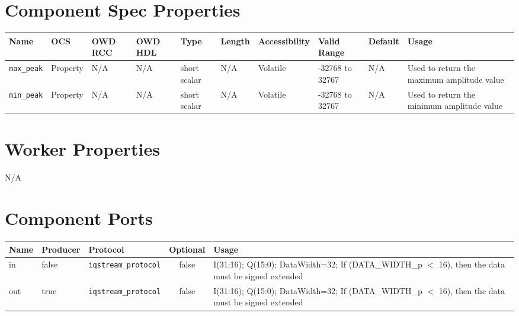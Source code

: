 \documentclass{article}
\begin{document}
\begin{landscape}
\section*{Component Spec Properties}

\begin{flushleft}

	\begin{scriptsize}
	\begin{tabular}{|p{1.5cm}|p{1.5cm}|p{1.5cm}|p{1.5cm}|p{2cm}|p{1cm}|p{1.5cm}|p{2cm}|p{1.5cm}|p{5cm}|}
		\hline
		\rowcolor{blue}
		Name & OCS & OWD RCC & OWD HDL & Type & Length  & Accessibility & Valid Range & Default & Usage \\
		\hline
		\verb+max_peak+ & Property & N/A & N/A & short scalar & N/A & Volatile & -32768 to 32767 & N/A & Used to return the maximum amplitude value\\
		\hline
		\verb+min_peak+ & Property & N/A & N/A & short scalar & N/A & Volatile & -32768 to 32767 & N/A & Used to return the minimum amplitude value\\
		\hline
	\end{tabular}
	\end{scriptsize}


\end{flushleft}

\section*{Worker Properties}
		N/A

\section*{Component Ports}

		\scriptsize
		\begin{tabular}{|M{2cm}|M{1cm}|M{4cm}|c|M{13.5cm}|}
			\hline
			Name & Producer & Protocol & Optional & Usage\\
			\hline
			in
			& false
			& \verb+iqstream_protocol+
			& false
			& I(31:16); Q(15:0); DataWidth=32; If (DATA\_WIDTH\_p $<$ 16), then the data must be signed extended \\
			\hline
			out
			& true
			& \verb+iqstream_protocol+
			& false
			& I(31:16); Q(15:0); DataWidth=32; If (DATA\_WIDTH\_p $<$ 16), then the data must be signed extended \\
			\hline
		\end{tabular}


\end{landscape}
\end{document}
